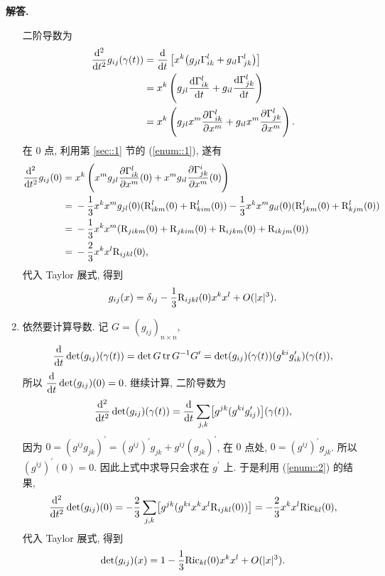 \documentclass{ctexart}
\newenvironment{solution}{\par\noindent\textbf{解答. }}{\par}
\begin{document}
\begin{solution}
\begin{enumerate}
        二阶导数为
        \[
            \begin{aligned}
            \dDif{^2}{t^2}g_{ij}(\gamma(t)) ={} & \dDif{}{t} \left[x^k \bigl( g_{jl}\Gamma^{l}_{ik} + g_{il}\Gamma^{l}_{jk} \bigr) \right] \\
            ={} & x^k\left( g_{jl}\dDif{\Gamma^l_{ik}}{t} + g_{il}\dDif{\Gamma^l_{jk}}{t} \right) \\
            ={} & x^k\left( g_{jl}x^m\pdDif{\Gamma^l_{ik}}{x^m} + g_{il}x^m\pdDif{\Gamma^l_{jk}}{x^m} \right).
            \end{aligned}
        \]
        在 $0$ 点, 利用第 \ref{sec::1} 节的 (\ref{enum::1}), 遂有
        \[
            \begin{aligned}
                \dfrac{\mathop{}\!\mathrm{d} ^2}{\mathop{}\!\mathrm{d} t^2}g_{ij}(0) ={} & x^k\left(x^m g_{jl} \dfrac{\partial \Gamma^l_{ik}}{\partial x^m}(0) + x^m g_{il} \dfrac{\partial \Gamma^i_{jk}}{\partial x^m}(0)\right) \\
                ={} & -\dfrac{1}{3}x^k x^m g_{jl}(0)(\mathrm{R}^l_{i k m}(0) + \mathrm{R}^{l}_{k i m}(0)) - \dfrac{1}{3}x^k x^m g_{il}(0)(\mathrm{R}^l_{j k m}(0) + \mathrm{R}^{l}_{k j m}(0)) \\
                ={} & -\dfrac{1}{3}x^k x^m (\mathrm{R}_{jikm}(0) + \mathrm{R}_{jkim}(0) + \mathrm{R}_{ijkm}(0) + \mathrm{R}_{ikjm}(0)) \\
                ={} & -\dfrac{2}{3}x^k x^l \mathrm{R}_{ijkl}(0),
            \end{aligned}
        \]
        代入 Taylor 展式, 得到
        \[
            g_{ij}(x) = \delta_{ij} - \dfrac{1}{3}\mathrm{R}_{ijkl}(0)x^k x^l + O(|x|^3).
        \]
        \item 依然要计算导数. 记 $G = (g_{ij})_{n \times n}$,
        \[
            \dfrac{\mathop{}\!\mathrm{d} }{\mathop{}\!\mathrm{d} t}\det (g_{ij})(\gamma(t)) = \det G \operatorname{tr} G^{-1}G^{\prime} = \det (g_{ij})(\gamma(t))(g^{ki}g_{ik}^{\prime})(\gamma(t)),
        \]
        所以 $\dfrac{\mathop{}\!\mathrm{d} }{\mathop{}\!\mathrm{d} t}\det (g_{ij})(0) = 0$. 继续计算, 二阶导数为
        \[
            \dfrac{\mathop{}\!\mathrm{d} ^2}{\mathop{}\!\mathrm{d} t^2}\det (g_{ij})(\gamma(t)) = \dfrac{\mathop{}\!\mathrm{d} }{\mathop{}\!\mathrm{d} t}\sum_{j, k} \bigl[g^{jk} (g^{ki}g_{ij}^{\prime})\bigr](\gamma(t)),
        \]
        因为 $0 = (g^{ij}g_{jk})^{\prime} = (g^{ij})^{\prime}g_{jk} + g^{ij}(g_{jk})^{\prime}$, 在 $0$ 点处, $0 = (g^{ij})^{\prime}g_{jk}$. 所以 $(g^{ij})^{\prime}(0) = 0$. 因此上式中求导只会求在 $g^{\prime}$ 上. 于是利用 (\ref{enum::2}) 的结果,
        \[
            \dfrac{\mathop{}\!\mathrm{d} ^2}{\mathop{}\!\mathrm{d} t^2}\det (g_{ij})(0) = -\dfrac{2}{3}\sum_{j, k} \bigl[g^{jk} (g^{ki}x^k x^l \mathrm{R}_{ijkl}(0))\bigr] = -\dfrac{2}{3}x^k x^l \mathrm{Ric}_{kl}(0),
        \]
        代入 Taylor 展式, 得到
        \[
            \det (g_{ij})(x) = 1 - \dfrac{1}{3}\mathrm{Ric}_{kl}(0)x^k x^l + O(|x|^3).
        \]
    \end{enumerate}
\end{solution}
\end{document}
